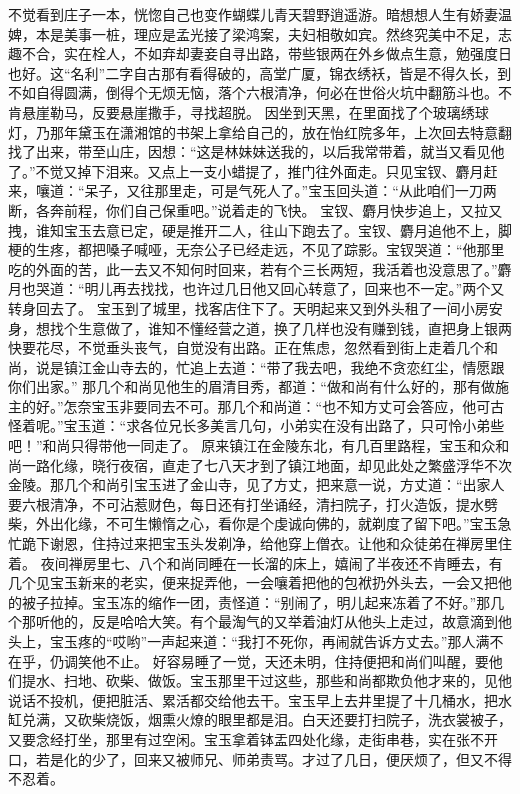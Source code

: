 \documentclass[12pt,oneside]{book}
\begin{document}
不觉看到庄子一本，恍惚自己也变作蝴蝶儿青天碧野逍遥游。暗想想人生有娇妻温婢，本是美事一桩，理应是孟光接了梁鸿案，夫妇相敬如宾。然终究美中不足，志趣不合，实在栓人，不如弃却妻妾自寻出路，带些银两在外乡做点生意，勉强度日也好。这“名利”二字自古那有看得破的，高堂广厦，锦衣绣袄，皆是不得久长，到不如自得圆满，倒得个无烦无恼，落个六根清净，何必在世俗火坑中翻筋斗也。不肯悬崖勒马，反要悬崖撒手，寻找超脱。
因坐到天黑，在里面找了个玻璃绣球灯，乃那年黛玉在潇湘馆的书架上拿给自己的，放在怡红院多年，上次回去特意翻找了出来，带至山庄，因想：“这是林妹妹送我的，以后我常带着，就当又看见他了。”不觉又掉下泪来。又点上一支小蜡提了，推门往外面走。只见宝钗、麝月赶来，嚷道：“呆子，又往那里走，可是气死人了。”宝玉回头道：“从此咱们一刀两断，各奔前程，你们自己保重吧。”说着走的飞快。
宝钗、麝月快步追上，又拉又拽，谁知宝玉去意已定，硬是推开二人，往山下跑去了。宝钗、麝月追他不上，脚梗的生疼，都把嗓子喊哑，无奈公子已经走远，不见了踪影。宝钗哭道：“他那里吃的外面的苦，此一去又不知何时回来，若有个三长两短，我活着也没意思了。”麝月也哭道：“明儿再去找找，也许过几日他又回心转意了，回来也不一定。”两个又转身回去了。
宝玉到了城里，找客店住下了。天明起来又到外头租了一间小房安身，想找个生意做了，谁知不懂经营之道，换了几样也没有赚到钱，直把身上银两快要花尽，不觉垂头丧气，自觉没有出路。正在焦虑，忽然看到街上走着几个和尚，说是镇江金山寺去的，忙追上去道：“带了我去吧，我绝不贪恋红尘，情愿跟你们出家。”
那几个和尚见他生的眉清目秀，都道：“做和尚有什么好的，那有做施主的好。”怎奈宝玉非要同去不可。那几个和尚道：“也不知方丈可会答应，他可古怪着呢。”宝玉道：“求各位兄长多美言几句，小弟实在没有出路了，只可怜小弟些吧！”和尚只得带他一同走了。
原来镇江在金陵东北，有几百里路程，宝玉和众和尚一路化缘，晓行夜宿，直走了七八天才到了镇江地面，却见此处之繁盛浮华不次金陵。那几个和尚引宝玉进了金山寺，见了方丈，把来意一说，方丈道：“出家人要六根清净，不可沾惹财色，每日还有打坐诵经，清扫院子，打火造饭，提水劈柴，外出化缘，不可生懒惰之心，看你是个虔诚向佛的，就剃度了留下吧。”宝玉急忙跪下谢恩，住持过来把宝玉头发剃净，给他穿上僧衣。让他和众徒弟在禅房里住着。
夜间禅房里七、八个和尚同睡在一长溜的床上，嬉闹了半夜还不肯睡去，有几个见宝玉新来的老实，便来捉弄他，一会嚷着把他的包袱扔外头去，一会又把他的被子拉掉。宝玉冻的缩作一团，责怪道：“别闹了，明儿起来冻着了不好。”那几个那听他的，反是哈哈大笑。有个最淘气的又举着油灯从他头上走过，故意滴到他头上，宝玉疼的“哎哟”一声起来道：“我打不死你，再闹就告诉方丈去。”那人满不在乎，仍调笑他不止。
好容易睡了一觉，天还未明，住持便把和尚们叫醒，要他们提水、扫地、砍柴、做饭。宝玉那里干过这些，那些和尚都欺负他才来的，见他说话不投机，便把脏活、累活都交给他去干。宝玉早上去井里提了十几桶水，把水缸兑满，又砍柴烧饭，烟熏火燎的眼里都是泪。白天还要打扫院子，洗衣裳被子，又要念经打坐，那里有过空闲。宝玉拿着钵盂四处化缘，走街串巷，实在张不开口，若是化的少了，回来又被师兄、师弟责骂。才过了几日，便厌烦了，但又不得不忍着。
\end{document}
